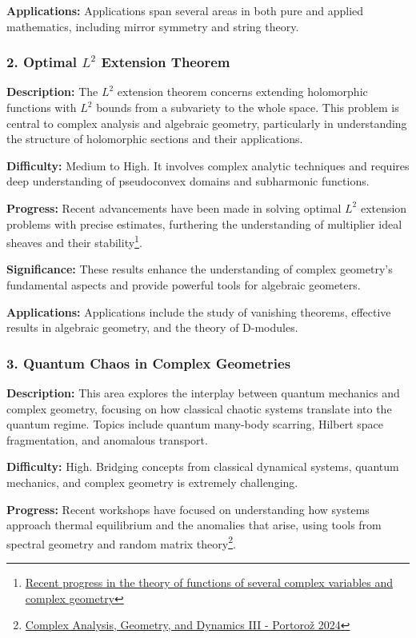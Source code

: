 \documentclass[lang=en,12pt]{beautybook}
\begin{document}
\textbf{Applications:} 
Applications span several areas in both pure and applied mathematics, including mirror symmetry and string theory.

\subsubsection*{2. Optimal \(L^2\) Extension Theorem}

\textbf{Description:} 
The \(L^2\) extension theorem concerns extending holomorphic functions with \(L^2\) bounds from a subvariety to the whole space. This problem is central to complex analysis and algebraic geometry, particularly in understanding the structure of holomorphic sections and their applications.

\textbf{Difficulty:} 
Medium to High. It involves complex analytic techniques and requires deep understanding of pseudoconvex domains and subharmonic functions.

\textbf{Progress:} 
Recent advancements have been made in solving optimal \(L^2\) extension problems with precise estimates, furthering the understanding of multiplier ideal sheaves and their stability\footnote{\href{https://link.springer.com/article/10.1134/S0040577924010112}{Recent progress in the theory of functions of several complex variables and complex geometry}}.

\textbf{Significance:} 
These results enhance the understanding of complex geometry's fundamental aspects and provide powerful tools for algebraic geometers.

\textbf{Applications:} 
Applications include the study of vanishing theorems, effective results in algebraic geometry, and the theory of D-modules.

\subsubsection*{3. Quantum Chaos in Complex Geometries}

\textbf{Description:} 
This area explores the interplay between quantum mechanics and complex geometry, focusing on how classical chaotic systems translate into the quantum regime. Topics include quantum many-body scarring, Hilbert space fragmentation, and anomalous transport.

\textbf{Difficulty:} 
High. Bridging concepts from classical dynamical systems, quantum mechanics, and complex geometry is extremely challenging.

\textbf{Progress:} 
Recent workshops have focused on understanding how systems approach thermal equilibrium and the anomalies that arise, using tools from spectral geometry and random matrix theory\footnote{\href{https://conferences.matheo.si/event/43/\#:\%7E:text=Save\%20\%0A\%0AEurope\%2FLjubljana\%20English\%20,\%E4\%B8\%AD\%E6\%96\%87\%20\%28\%E4\%B8\%AD\%E5\%9B\%BD\%29\%0A\%0A\%E3\%80\%905\%E2\%80\%A0L}{Complex Analysis, Geometry, and Dynamics III - Portorož 2024}}.
\end{document}
